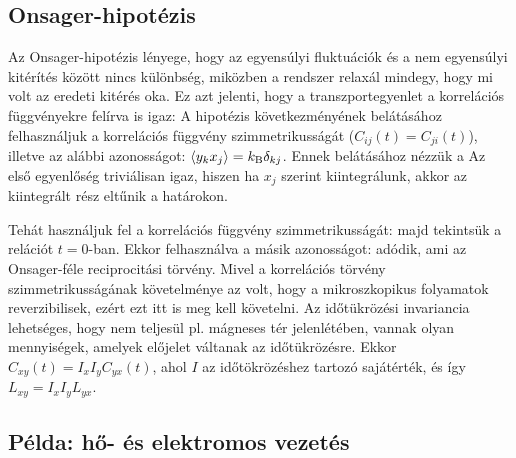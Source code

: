   \subsection{Onsager-hipotézis}
   
   Az Onsager-hipotézis lényege, hogy az egyensúlyi fluktuációk és a nem egyensúlyi kitérítés között nincs különbség, miközben a rendszer relaxál mindegy, hogy mi volt az eredeti kitérés oka. Ez azt jelenti, hogy a transzportegyenlet a korrelációs függvényekre felírva is igaz:
   A hipotézis következményének belátásához felhasználjuk a korrelációs függvény szimmetrikusságát ($C_{ij}(t)=C_{ji}(t)$), illetve az alábbi azonosságot: $\left\langle y_k x_j\right\rangle=k_\text{B}\delta_{kj}$. Ennek belátásához nézzük a 
   Az első egyenlőség triviálisan igaz, hiszen ha $x_j$ szerint kiintegrálunk, akkor az kiintegrált rész eltűnik a határokon. 
   
   Tehát használjuk fel a korrelációs függvény szimmetrikusságát:
   majd tekintsük a relációt $t=0$-ban. Ekkor felhasználva a másik azonosságot:
   adódik, ami az Onsager-féle reciprocitási törvény. Mivel a korrelációs törvény szimmetrikusságának követelménye az volt, hogy a mikroszkopikus folyamatok reverzibilisek, ezért ezt itt is meg kell követelni. Az időtükrözési invariancia lehetséges, hogy nem teljesül pl. mágneses tér jelenlétében, vannak olyan mennyiségek, amelyek előjelet váltanak az időtükrözésre. Ekkor $C_{xy}(t)=I_x I_y C_{yx}(t)$, ahol $I$ az időtökrözéshez tartozó sajátérték, és így $L_{xy}=I_x I_y L_{yx}$.
   
  \subsection{Példa: hő- és elektromos vezetés}
   
